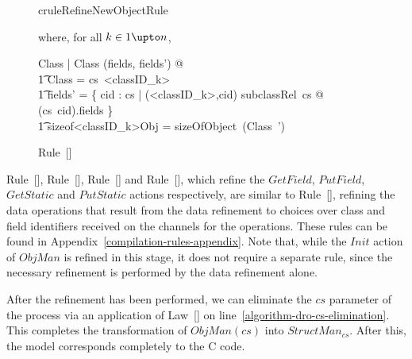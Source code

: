 \begin{figure}[t!]
\begin{restatable}{crule}{RefineNewObjectRule}
\begin{circus}
    \end{circus}
    where, for all $k \in 1 \upto n$,
    \begin{circus} 
        \exists \Delta Class | \Xi Class \hide (fields, fields') @ \\
        \t1 \theta Class = cs~{<}classID_k{>} \land \\
        \t1 fields' = \bigcup \{ cid : \dom cs | ({<}classID_k{>},cid) \in subclassRel~cs @ (cs~cid).fields \} \land  \\
        \t1 sizeof{<}classID_k{>}Obj = sizeOfObject~(\theta Class~') \\
    \end{circus}
  \end{restatable}
  \caption{Rule~[]}
  \label{refine-NewObject-rule-figure}
\end{figure}

Rule~[],
Rule~[],
Rule~[] and
Rule~[], which refine the $GetField$,
$PutField$, $GetStatic$ and $PutStatic$ actions respectively, are
similar to Rule~[], refining the data
operations that result from the data refinement to choices over class
and field identifiers received on the channels for the operations.
These rules can be found in Appendix~\ref{compilation-rules-appendix}.
Note that, while the $Init$ action of $ObjMan$ is refined in this
stage, it does not require a separate rule, since the necessary
refinement is performed by the data refinement alone.

After the refinement has been performed, we can eliminate the $cs$
parameter of the process via an application of
Law~[] on
line~\ref{algorithm-dro-cs-elimination}.
This completes the transformation of $ObjMan(cs)$ into
$StructMan_{cs}$.
After this, the model corresponds completely to the C code.
